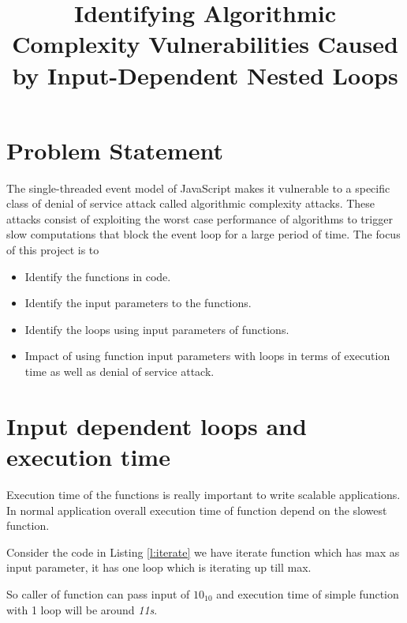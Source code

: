 \documentclass[authoryear,preprint]{sigplanconf}
\begin{document}
\setlength{\pdfpageheight}{\paperheight}
\setlength{\pdfpagewidth}{\paperwidth}


\title{Identifying Algorithmic Complexity Vulnerabilities Caused by
Input-Dependent Nested Loops}

\maketitle

\section{Problem Statement}
\label{sec:problemstatement}

The single-threaded event model of JavaScript makes it vulnerable
to a specific class of denial of service attack called algorithmic
complexity attacks. These attacks consist of exploiting the worst
case performance of algorithms to trigger slow computations that
block the event loop for a large period of time. The focus of this
project is to
\begin{itemize}
\item Identify the functions in code.
\item Identify the input parameters to the functions.
\item Identify the loops using input parameters of functions.
\item Impact of using function input parameters with loops in terms
of execution time as well as denial of service attack.
\end{itemize}


\section{Input dependent loops and execution time}
\label{sec:introduction}
Execution time of the functions is really important to write scalable applications. In normal application overall execution time of function depend on the slowest function.

Consider the code in Listing \ref{l:iterate} we have iterate function which has max as input parameter, it has one loop which is iterating up till max.

So caller of function can pass input of \begin{math} 10_{10} \end{math} and execution time of simple function with 1 loop will be around \textit{11s}.
\end{document}
